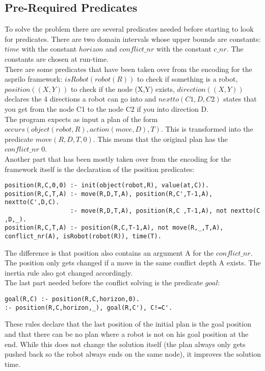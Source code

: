\documentclass[runningheads]{llncs}
\begin{document}
\subsection{Pre-Required Predicates}
To solve the problem there are several predicates needed before starting to look for predicates. There are two domain intervals whose upper bounds are constants: $time$ with the constant $horizon$ and $conflict\_nr$ with the constant $c\_nr$.
The constants are chosen at run-time. \\ There are some predicates that have been taken over from the encoding for the asprilo framework: $isRobot(robot(R))$ to check if something is a robot, $position((X,Y))$ to check if the node (X,Y) exists, $direction((X,Y))$ declares the 4 directions a robot can go into and $nextto(C1,D,C2)$ states that you get from the node C1 to the node C2 if you into direction D. \\  
The program expects as input a plan of the form $occurs(object(robot,R),action(move,D),T)$. This is transformed into the predicate $move(R,D,T,0)$. This means that the original plan has the $conflict\_nr$ 0. \\
Another part that has been mostly taken over from the encoding for the framework itself is the declaration of the position predicates:
\begin{verbatim}
position(R,C,0,0) :- init(object(robot,R), value(at,C)).
position(R,C,T,A) :- move(R,D,T,A), position(R,C',T-1,A), nextto(C',D,C).
                  :- move(R,D,T,A), position(R,C ,T-1,A), not nextto(C ,D,_).
position(R,C,T,A) :- position(R,C,T-1,A), not move(R,_,T,A), conflict_nr(A), isRobot(robot(R)), time(T).
\end{verbatim}
The difference is that position also contains an argument A for the $conflict\_nr$. The position only gets changed if a move in the same conflict depth A exists. The inertia rule also got changed accordingly. \\
The last part needed before the conflict solving is the predicate $goal$:
\begin{verbatim}
goal(R,C) :- position(R,C,horizon,0).
:- position(R,C,horizon,_), goal(R,C'), C!=C'.
\end{verbatim}
These rules declare that the last position of the initial plan is the goal position and that there can be no plan where a robot
is not on his goal position at the end. While this does not change the solution itself (the plan always only gets pushed back so the robot always ends on the same node), it improves the solution time. \\
\end{document}
